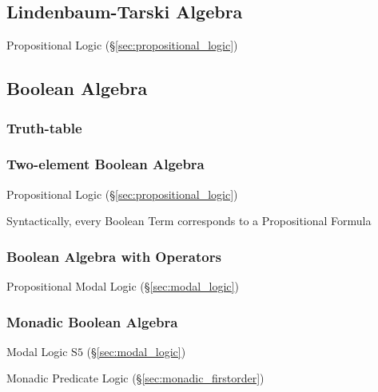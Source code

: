 \subsection{Lindenbaum-Tarski Algebra}\label{sec:lindenbaum_tarski}

Propositional Logic (\S\ref{sec:propositional_logic})



\subsection{Boolean Algebra}\label{sec:boolean_algebra}

\subsubsection{Truth-table}\label{sec:truth_table}

\subsubsection{Two-element Boolean Algebra}\label{sec:twoelement_boolean}

Propositional Logic (\S\ref{sec:propositional_logic})

Syntactically, every Boolean Term corresponds to a Propositional
Formula



\subsubsection{Boolean Algebra with Operators}\label{sec:boolean_with_operators}

Propositional Modal Logic (\S\ref{sec:modal_logic})



\subsubsection{Monadic Boolean Algebra}\label{sec:monadic_boolean}

Modal Logic $\mathrm{S5}$ (\S\ref{sec:modal_logic})

Monadic Predicate Logic (\S\ref{sec:monadic_firstorder})



